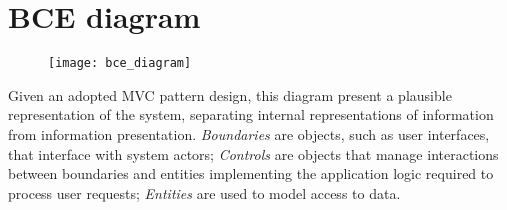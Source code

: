 \section{BCE diagram}
\label{subsect:BCE diagram}
	\begin{figure}[H]
	\vspace*{-55px}
	\hspace*{-73pt}
		\texttt{[image: bce\_diagram]}
		\centering
	\end{figure}
	Given an adopted MVC pattern design, this diagram present a plausible representation of the system, separating internal representations of information from information presentation. \textit{Boundaries} are objects, such as user interfaces, that interface with system actors; \textit{Controls} are objects that manage interactions between
boundaries and entities implementing the application logic required to process
user requests; \textit{Entities} are used to model access to data.
